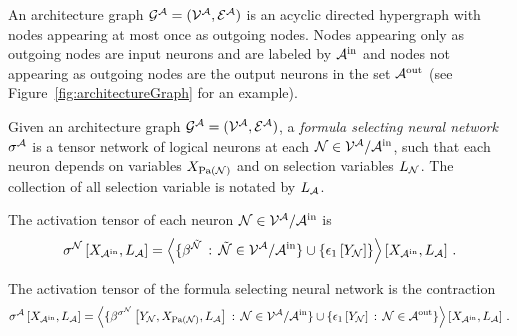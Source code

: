 \begin{definition}
    \label{def:fsNeuralNetwork}


    An architecture graph $\mathcal{G}^{\mathcal{A}}=(\mathcal{V}^{\mathcal{A}},\mathcal{E}^{\mathcal{A}})$ is an acyclic directed hypergraph with nodes appearing at most once as outgoing nodes.
    Nodes appearing only as outgoing nodes are input neurons and are labeled by $\mathcal{A}^{\mathrm{in}}$ and nodes not appearing as outgoing nodes are the output neurons in the set $\mathcal{A}^{\mathrm{out}}$ (see Figure~\ref{fig:architectureGraph} for an example).

    Given an architecture graph $\mathcal{G}^{\mathcal{A}}=(\mathcal{V}^{\mathcal{A}},\mathcal{E}^{\mathcal{A}})$, a \emph{formula selecting neural network} $\sigma^{\mathcal{A}}$ is a tensor network of logical neurons at each $\mathcal{N}\in\mathcal{V}^{\mathcal{A}}/\mathcal{A}^{\mathrm{in}}$, such that each neuron depends on variables $X_{\mathrm{Pa}(\mathcal{N})}$ and on selection variables $L_{\mathcal{N}}$.
    The collection of all selection variable is notated by $L_{\mathcal{A}}$.

    The activation tensor of each neuron $\mathcal{N}\in\mathcal{V}^{\mathcal{A}}/\mathcal{A}^{\mathrm{in}}$ is
    \begin{align*}
        \sigma^{\mathcal{N}}\left[X_{\mathcal{A}^{\mathrm{in}}},L_{\mathcal{A}}\right]
        = \left\langle 
            \{\beta^{\tilde{\mathcal{N}}} \, : \, \tilde{\mathcal{N}}\in\mathcal{V}^{\mathcal{A}}/\mathcal{A}^{\mathrm{in}} \} \cup \{\epsilon_{1}\left[Y_{\mathcal{N}}\right]\}
        \right\rangle \left[ X_{\mathcal{A}^{\mathrm{in}}},L_{\mathcal{A}} \right] \, .
    \end{align*}

    The activation tensor of the formula selecting neural network is the contraction
    \begin{align*}
        \sigma^{\mathcal{A}}\left[X_{\mathcal{A}^{\mathrm{in}}},L_{\mathcal{A}}\right]
        = \left\langle 
            \{\beta^{\sigma^{\mathcal{N}}}\left[Y_{\mathcal{N}},X_{\mathrm{Pa}(\mathcal{N})},L_{\mathcal{A}}\right] \, : \, \mathcal{N}\in\mathcal{V}^{\mathcal{A}}/\mathcal{A}^{\mathrm{in}} \} \cup \{\epsilon_{1}\left[Y_{\mathcal{N}}\right] \, : \, \mathcal{N}\in\mathcal{A}^{\mathrm{out}}\}
        \right\rangle \left[ X_{\mathcal{A}^{\mathrm{in}}},L_{\mathcal{A}} \right] \, .
    \end{align*}


\end{definition}
